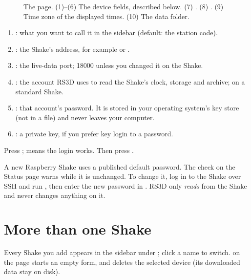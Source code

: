 \begin{figure}[tbp]
\centering
{}
\caption{The  page. (1)--(6) The device fields, described below. (7) . (8) . (9) Time zone of the displayed times. (10) The data folder.}
\end{figure}

\begin{enumerate}
\item {}: what you want to call it in the sidebar (default: the station code).
\item {}: the Shake's address, for example  or .
\item {}: the live-data port; 18000 unless you changed it on the Shake.
\item {}: the account RS3D uses to read the Shake's clock, storage and archive;  on a standard Shake.
\item {}: that account's password. It is stored in your operating system's key store (not in a file) and never
  leaves your computer.
\item {}: a private key, if you prefer key login to a password.
\end{enumerate}
Press ;  means the login works. Then press .

\begin{rs3dwarn}
A new Raspberry Shake uses a published default password. The  check on the Status page warns while it is unchanged. To
change it, log in to the Shake over SSH and run , then enter the new password in . RS3D only \emph{reads}
from the Shake and never changes anything on it.
\end{rs3dwarn}

\section{More than one Shake}
Every Shake you add appears in the sidebar under ; click a name to switch.  on the  page
starts an empty form, and  deletes the selected device (its downloaded data stay on disk).
